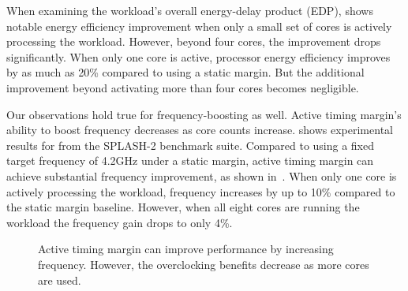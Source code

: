 When examining the workload's overall energy-delay product (EDP),  shows notable energy efficiency improvement when only a small set of cores is actively processing the workload. However, beyond four cores, the improvement drops significantly. When only one core is active, processor energy efficiency improves by as much as 20\% compared to using a static margin. But the additional improvement beyond activating more than four cores becomes negligible. 

Our observations hold true for frequency-boosting as well. Active timing margin's ability to boost frequency decreases as core counts increase.  shows experimental results for  from the SPLASH-2 benchmark suite. Compared to using a fixed target frequency of 4.2GHz under a static margin, active timing margin can achieve substantial frequency improvement, as shown in~. When only one core is actively processing the workload, frequency increases by up to 10\% compared to the static margin baseline. However, when all eight cores are running the workload the frequency gain drops to only 4\%.

\begin{figure}
\centering
    \caption{Active timing margin can improve performance by increasing frequency. However, the overclocking benefits decrease as more cores are used.}
    \label{fig:lucb-inefficiency}
 \end{figure}

